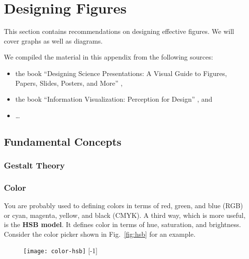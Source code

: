  
\chapter{Designing Figures}

This section contains recommendations on designing effective figures. We will cover graphs as well as diagrams.

We compiled the material in this appendix from the following sources:
\begin{itemize}
  \item the book ``Designing Science Presentations: A Visual Guide to Figures, Papers, Slides, Posters, and More'' \cite{Carter12},
  \item the book ``Information Visualization: Perception for Design'' \cite{Ware12}, and 
  \item …
\end{itemize}

\section{Fundamental Concepts}

\subsection{Gestalt Theory}


% 

\subsection{Color}

You are probably used to defining colors in terms of red, green, and blue (RGB) or cyan, magenta, yellow, and black (CMYK). A third way, which is more useful, is the \textbf{HSB model}. It defines color in terms of hue, saturation, and brightness. Consider the color picker shown in Fig.~\ref{fig:hsb} for an example.

\begin{figure}
\centering
\texttt{[image: color-hsb]}
[-1\baselineskip]
\end{figure}

